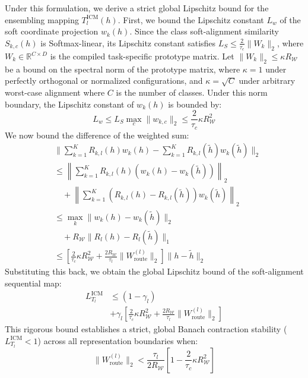 Under this formulation, we derive a strict global Lipschitz bound for the ensembling mapping $T_l^{\text{ICM}}(h)$. First, we bound the Lipschitz constant $L_w$ of the soft coordinate projection $w_k(h)$. Since the class soft-alignment similarity $S_{k, c}(h)$ is Softmax-linear, its Lipschitz constant satisfies $L_S \le \frac{2}{\tau_c} \|W_k\|_2$, where $W_k \in \mathbb{R}^{C \times D}$ is the compiled task-specific prototype matrix. Let $\|W_k\|_2 \le \kappa R_{\mathcal{W}}$ be a bound on the spectral norm of the prototype matrix, where $\kappa = 1$ under perfectly orthogonal or normalized configurations, and $\kappa = \sqrt{C}$ under arbitrary worst-case alignment where $C$ is the number of classes. Under this norm boundary, the Lipschitz constant of $w_k(h)$ is bounded by:
\begin{equation}
L_w \le L_S \max_{c} \|w_{k, c}\|_2 \le \frac{2}{\tau_c} \kappa R_{\mathcal{W}}^2
\end{equation}
We now bound the difference of the weighted sum:
\begin{align}
&\Big\| \sum_{k=1}^K R_{k, l}(h) w_k(h) - \sum_{k=1}^K R_{k, l}(\tilde{h}) w_k(\tilde{h}) \Big\|_2 \nonumber \\
&\le \left\| \sum_{k=1}^K R_{k, l}(h) \left( w_k(h) - w_k(\tilde{h}) \right) \right\|_2 \nonumber \\
&\quad + \left\| \sum_{k=1}^K \left( R_{k, l}(h) - R_{k, l}(\tilde{h}) \right) w_k(\tilde{h}) \right\|_2 \nonumber \\
&\le \max_k \|w_k(h) - w_k(\tilde{h})\|_2 \nonumber \\
&\quad + R_{\mathcal{W}} \|R_l(h) - R_l(\tilde{h})\|_1 \nonumber \\
&\le \left[ \frac{2}{\tau_c} \kappa R_{\mathcal{W}}^2 + \frac{2 R_{\mathcal{W}}}{\tau_l} \|W_{\text{route}}^{(l)}\|_2 \right] \|h - \tilde{h}\|_2
\end{align}
Substituting this back, we obtain the global Lipschitz bound of the soft-alignment sequential map:
\begin{align}
L_{T_l}^{\text{ICM}} & \le (1 - \gamma_l) \nonumber \\
& + \gamma_l \left[ \frac{2}{\tau_c} \kappa R_{\mathcal{W}}^2 + \frac{2 R_{\mathcal{W}}}{\tau_l} \|W_{\text{route}}^{(l)}\|_2 \right]
\end{align}
This rigorous bound establishes a strict, global Banach contraction stability ($L_{T_l}^{\text{ICM}} < 1$) across all representation boundaries when:
\begin{equation}
\|W_{\text{route}}^{(l)}\|_2 < \frac{\tau_l}{2 R_{\mathcal{W}}} \left[ 1 - \frac{2}{\tau_c} \kappa R_{\mathcal{W}}^2 \right]
\end{equation}
